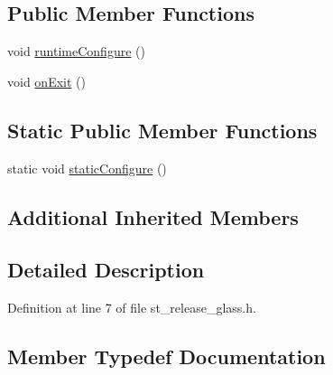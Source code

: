 \subsection*{Public Member Functions}
\begin{DoxyCompactItemize}
\item 
void \hyperlink{structsm__moveit__wine__serve_1_1StReleaseGlass_a79b2f652fe4d43d24c1704480d3257a3}{runtime\+Configure} ()
\item 
void \hyperlink{structsm__moveit__wine__serve_1_1StReleaseGlass_aada61c1daeedac941ae6ac865e87b971}{on\+Exit} ()
\end{DoxyCompactItemize}
\subsection*{Static Public Member Functions}
\begin{DoxyCompactItemize}
\item 
static void \hyperlink{structsm__moveit__wine__serve_1_1StReleaseGlass_a6a7d642023c9fe9fd9ad2d311690f1cc}{static\+Configure} ()
\end{DoxyCompactItemize}
\subsection*{Additional Inherited Members}


\subsection{Detailed Description}


Definition at line 7 of file st\+\_\+release\+\_\+glass.\+h.



\subsection{Member Typedef Documentation}
\mbox{\label{structsm__moveit__wine__serve_1_1StReleaseGlass_af1674c12703267ddfd7d0ff5fa6394f6}} 
